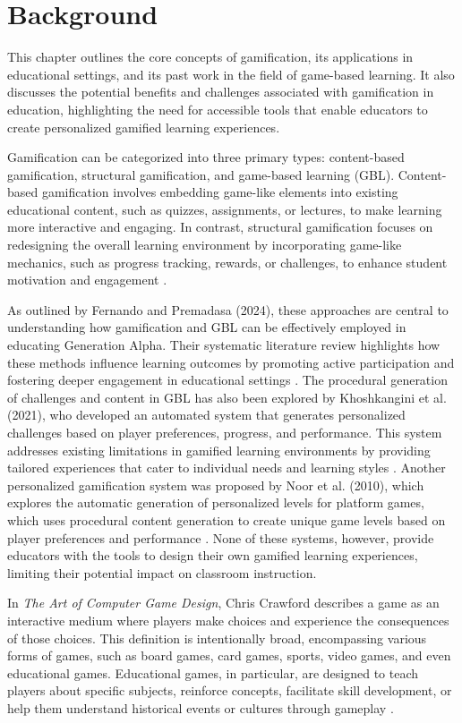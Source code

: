 \chapter{Background}\label{chap:background}
This chapter outlines the core concepts of gamification, its applications in educational settings, and its past work in the field of game-based learning. It also discusses the potential benefits and challenges associated with gamification in education, highlighting the need for accessible tools that enable educators to create personalized gamified learning experiences.

Gamification can be categorized into three primary types: content-based gamification, structural gamification, and game-based learning (GBL). Content-based gamification involves embedding game-like elements into existing educational content, such as quizzes, assignments, or lectures, to make learning more interactive and engaging. In contrast, structural gamification focuses on redesigning the overall learning environment by incorporating game-like mechanics, such as progress tracking, rewards, or challenges, to enhance student motivation and engagement \cite{fernando2024}.

As outlined by Fernando and Premadasa (2024), these approaches are central to understanding how gamification and GBL can be effectively employed in educating Generation Alpha. Their systematic literature review highlights how these methods influence learning outcomes by promoting active participation and fostering deeper engagement in educational settings \cite{fernando2024}. The procedural generation of challenges and content in GBL has also been explored by Khoshkangini et al. (2021), who developed an automated system that generates personalized challenges based on player preferences, progress, and performance. This system addresses existing limitations in gamified learning environments by providing tailored experiences that cater to individual needs and learning styles \cite{khoshkangini2021}. Another personalized gamification system was proposed by Noor et al. (2010), which explores the automatic generation of personalized levels for platform games, which uses procedural content generation to create unique game levels based on player preferences and performance \cite{noor2010}. None of these systems, however, provide educators with the tools to design their own gamified learning experiences, limiting their potential impact on classroom instruction.

In \emph{The Art of Computer Game Design}, Chris Crawford describes a game as an interactive medium where players make choices and experience the consequences of those choices. This definition is intentionally broad, encompassing various forms of games, such as board games, card games, sports, video games, and even educational games. Educational games, in particular, are designed to teach players about specific subjects, reinforce concepts, facilitate skill development, or help them understand historical events or cultures through gameplay \cite{crawford1982art}.

